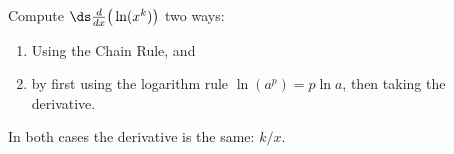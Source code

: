 {Compute $\ds \frac{d}{dx}\big(\ln (x^k)\big) $ two ways: 
\begin{enumerate}
\item		Using the Chain Rule, and 
\item		by first using the logarithm rule $\ln (a^p) = p\ln a$, then taking the derivative.
\end{enumerate}
}
{In both cases the derivative is the same: $k/x$. 
}
